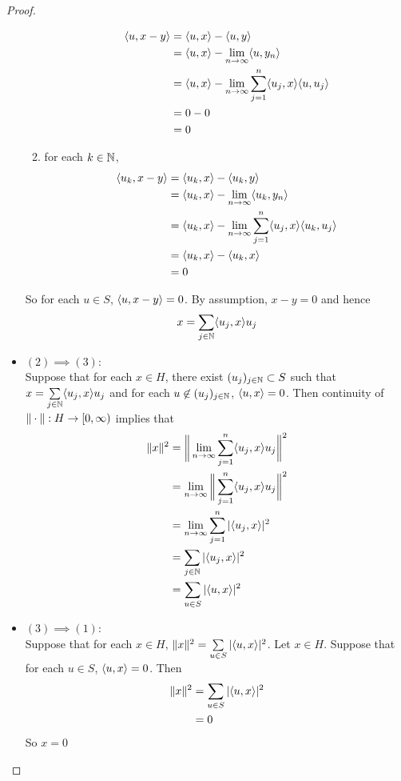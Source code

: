 \documentclass{book}
\begin{document}
\begin{proof}
\begin{itemize}
\begin{enumerate}
\begin{align*}
		\langle u, x - y\rangle 
		&= \langle u, x \rangle  - \langle u, y \rangle \\
		&=  \langle u, x \rangle - \lim \limits_{n \rightarrow \infty} \langle u, y_n\rangle \\
		&=  \langle u, x \rangle - \lim \limits_{n \rightarrow \infty} \sum_{j=1}^n \langle u_j, x\rangle \langle u, u_j \rangle \\
		&= 0 - 0 \\
		&=0
		\end{align*}
		\item for each $k \in \mathbb{N}$, 
		\begin{align*}
		\langle u_k, x - y\rangle 
		&= \langle u_k, x \rangle  - \langle u_k, y \rangle \\
		&= \langle u_k, x \rangle - \lim \limits_{n \rightarrow \infty} \langle u_k, y_n\rangle \\
		&= \langle u_k, x \rangle - \lim \limits_{n \rightarrow \infty} \sum_{j=1}^n \langle u_j, x\rangle \langle u_k, u_j \rangle \\
		&= \langle u_k, x \rangle  - \langle u_k, x\rangle \\
		&= 0
		\end{align*}
		\end{enumerate}
		So for each $u \in S$, $\langle u, x-y\rangle =0$. By assumption, $x-y = 0$ and hence 
		$$x = \sum\limits_{j \in \mathbb{N}}\langle u_j, x \rangle u_j$$
		
		\item $(2) \implies (3)$:\\
		Suppose that for each $x \in H$, there exist $(u_j)_{j\in \mathbb{N}} \subset S$ such that $x = \sum\limits_{j \in \mathbb{N}} \langle u_j, x\rangle u_j$ and for each $u \not \in (u_j)_{j\in \mathbb{N}}$, $\langle u, x\rangle =0$. Then continuity of $\|\cdot\|:H \rightarrow [0,\infty)$ implies that
		\begin{align*}
		\|x\|^2 
		&= \bigg \|  \lim \limits_{n \rightarrow \infty} \sum_{j=1}^n \langle u_j, x\rangle u_j \bigg \|^2 \\
		&= \lim \limits_{n \rightarrow \infty} \bigg \|\sum_{j=1}^n \langle u_j, x\rangle u_j \bigg \|^2 \\
		&= \lim \limits_{n \rightarrow \infty} \sum_{j=1}^n |\langle u_j, x\rangle |^2 \\
		&= \sum_{j \in \mathbb{N}}|\langle u_j, x\rangle |^2  \\
		&= \sum_{u \in S}|\langle u, x\rangle |^2 
		\end{align*}
		\item $(3) \implies (1)$:\\
		Suppose that for each $x \in H$, $\|x\|^2 = \sum\limits_{u \in S} | \langle u, x \rangle |^2$. Let $x \in H$. Suppose that for each $u \in S$, $\langle u,x \rangle = 0$. Then 
		\begin{align*}
		\| x\|^2 
		&= \sum_{u \in S}  | \langle u, x \rangle |^2 \\
		&= 0
		\end{align*}
		So $x =0$
\end{itemize}
\end{proof}
\end{document}
